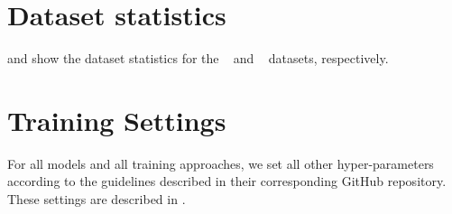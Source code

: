 \clearpage
\appendix

\section{Dataset statistics}
\label{apx:dataset_stats}
 and  show the dataset statistics for the \chocolate~ and \mathv~ datasets, respectively.









\section{Training Settings}

\label{apx:training_setting}
For all models and all training approaches, we set all other hyper-parameters according to the guidelines described in their corresponding GitHub repository. These settings are described in . 



